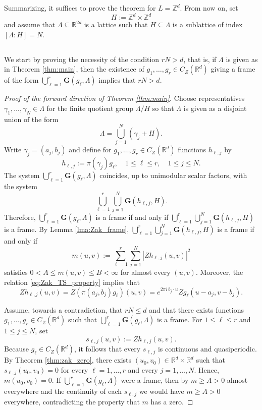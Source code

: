 \documentclass[reqno,a4paper,12pt]{amsart}
\numberwithin{equation}{section}
\def\R{{\mathbb R}}
\newcommand{\Rd}{{\R^d}}
\newcommand\1{\mathds{1}}
\begin{document}
Summarizing, it suffices to prove the theorem for
$
L=\mathbb Z^d.
$
From now on, set
$$
H:=\mathbb Z^d\times\mathbb Z^d
$$
and assume that $\Lambda \subseteq \R^{2d}$ is a lattice such that $H\subseteq\Lambda$ is a sublattice of index
$
[\Lambda:H]=N.
$

\subsection{}
We start by proving the necessity of the condition $rN > d$, that is, if $\Lambda$ is given as in Theorem \ref{thm:main}, then the existence of $g_1,\dots,g_r\in C_Z(\mathbb R^d)$ giving a frame of the form
$
\bigcup_{\ell=1}^r \mathbf G(g_\ell,\Lambda)
$
implies that $rN > d$.

\begin{proof}[Proof of the forward direction of Theorem \ref{thm:main}]
Choose representatives
$
\gamma_1,\dots,\gamma_N\in\Lambda
$
for the finite quotient group
$
\Lambda/H
$
so that $\Lambda$ is given as a disjoint union of the form
$$
\Lambda
=
\bigcup_{j=1}^N(\gamma_j+H).
$$
Write
$
\gamma_j=(a_j,b_j)
$
and
define for $g_1,\dots,g_r \in C_Z(\Rd) $ functions $h_{\ell,j}$ by 
$$
h_{\ell,j}:=\pi(\gamma_j)g_\ell,
\quad
1\le \ell\le r,\quad 1\le j\le N.
$$
The system
$
\bigcup_{\ell=1}^r\mathbf G(g_\ell,\Lambda)
$
coincides, up to unimodular scalar factors, with the system
$$
\bigcup_{\ell=1}^r\bigcup_{j=1}^N\mathbf G(h_{\ell,j},H).
$$
Therefore, $\bigcup_{\ell=1}^r\mathbf G(g_\ell,\Lambda)$ is a frame if and only if $\bigcup_{\ell=1}^r\bigcup_{j=1}^N\mathbf G(h_{\ell,j},H)$ is a frame.
By Lemma \ref{lma:Zak_frame}, $\bigcup_{\ell=1}^r\bigcup_{j=1}^N\mathbf G(h_{\ell,j},H)$ is a frame if and only if
$$
m(u,v)
:=
\sum_{\ell=1}^r\sum_{j=1}^N
|Z h_{\ell,j}(u,v)|^2
$$
satisfies $0<A \leq m(u,v) \leq B < \infty$ for almost every $(u,v)$.
Moreover, the relation \eqref{eq:Zak_TS_property} implies that
$$
Z h_{\ell,j}(u,v)
=
Z(\pi(a_j,b_j)g_\ell)(u,v)
=
e^{2\pi i\,b_j\cdot u}Zg_\ell(u-a_j,v-b_j).
$$

Assume, towards a contradiction, that
$
rN\le d
$
and that there exists functions
$
g_1,\dots,g_r\in C_Z(\mathbb R^d)
$
such that
$
\bigcup_{\ell=1}^r\mathbf G(g_\ell,\Lambda)
$
is a frame. For $1\le\ell\le r$ and $1\le j\le N$, set
$$
s_{\ell,j}(u,v):=Zh_{\ell,j}(u,v).
$$
Because $g_\ell\in C_Z(\mathbb R^d)$, it follows that every
$s_{\ell,j}$ is continuous and quasiperiodic. By Theorem \ref{thm:zak_zero}, there exists
$
(u_0,v_0)\in\mathbb R^d\times\mathbb R^d
$
such that
$
s_{\ell,j}(u_0,v_0)=0
$
for every $\ell=1,\dots,r$ and every $j=1,\dots,N$. Hence,
$
m(u_0,v_0)=0.
$
If $\bigcup_{\ell=1}^r\mathbf G(g_\ell,\Lambda)$ were a frame, then by $m \geq A >0$ almost everywhere and the continuity of each $s_{\ell,j}$ we would have $m \geq A >0$ everywhere, contradicting the property that $m$ has a zero.
\end{proof}
\end{document}
